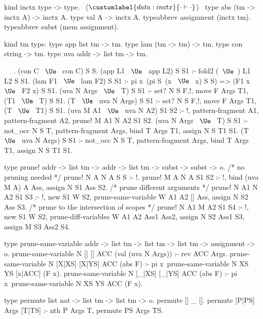 \begin{elpicode}

  kind inctx type -> type.                              ~($\customlabel{data:inctx}{\cdot\vdash\cdot}$)~
  type abs (tm -> inctx A) -> inctx A.
  type val A -> inctx A.
  typeabbrev assignment (inctx tm).
  typeabbrev subst (mem assignment).

  kind tm  type.
  type app list tm -> tm.
  type lam (tm -> tm) -> tm.
  type con string -> tm.
  type uva addr -> list tm -> tm.

  ~  ~.
  (con C ~$\Ue$~ con C) S S.
  (app L1 ~$\Ue$~ app L2) S S1 :- fold2 (~$\Ue$~) L1 L2 S S1.
  (lam F1 ~$\Ue$~ lam F2) S S1 :- 
    pi x\ (pi S\ (x ~$\Ue$~ x) S S) => (F1 x ~$\Ue$~ F2 x) S S1.
  (uva N Args ~$\Ue$~ T) S S1 :- 
    set? N S F,!, move F Args T1, (T1 ~$\Ue$~ T) S S1.
  (T ~$\Ue$~ uva N Args) S S1 :- 
    set? N S F,!, move F Args T1, (T ~$\Ue$~ T1) S S1.
  (uva M A1 ~$\Ue$~ uva N A2) S1 S2 :- !, 
    pattern-fragment A1, pattern-fragment A2, 
    prune! M A1 N A2 S1 S2.
  (uva N Args ~$\Ue$~ T) S S1 :- not_occ N S T, pattern-fragment Args, 
    bind T Args T1, assign N S T1 S1.
  (T ~$\Ue$~ uva N Args) S S1 :- not_occ N S T, pattern-fragment Args, 
    bind T Args T1, assign N S T1 S1.

  type prune! addr -> list tm -> addr -> 
              list tm -> subst -> subst -> o.
  /* no pruning needed */               
  prune! N A  N A  S S :- !.
  prune! M A  N A  S1 S2 :- !, bind (uva M A) A Ass, 
    assign N S1 Ass S2.
  /* prune different arguments */
  prune! N A1 N A2 S1 S3 :- !,
    new S1 W S2, prune-same-variable W A1 A2 [] Ass,
    assign N S2 Ass S3.
  /* prune to the intersection of scopes */
  prune! N A1 M A2 S1 S4 :- !,
    new S1 W S2, prune-diff-variables W A1 A2 Ass1 Ass2, 
    assign N S2 Ass1 S3,
    assign M S3 Ass2 S4. 

  type prune-same-variable addr -> list tm -> list tm -> 
                            list tm -> assignment -> o.
  prune-same-variable N [] [] ACC (val (uva N Args)) :- 
    rev ACC Args.
  prune-same-variable N [X|XS] [X|YS] ACC (abs F) :- 
    pi x\ prune-same-variable N XS YS [x|ACC] (F x).
  prune-same-variable N [_|XS] [_|YS] ACC (abs F) :- 
    pi x\ prune-same-variable N XS YS ACC (F x).

  type permute list nat -> list tm -> list tm -> o.
  permute [] _ [].
  permute [P|PS] Args [T|TS] :-
    nth P Args T,
    permute PS Args TS.


\end{elpicode}

